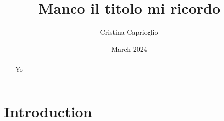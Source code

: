 \documentclass[]{article}
\title{Manco il titolo mi ricordo}
\author{Cristina Caprioglio}
\date{March 2024 }
\begin{document}
\maketitle
\begin{abstract}
	
Yo
\end{abstract}	
\section{Introduction}

	
\end{document}
